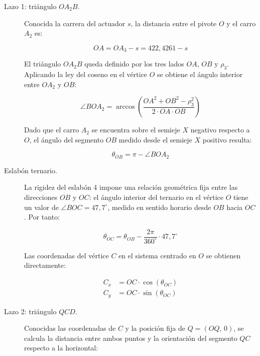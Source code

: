 \begin{description}
\item [Lazo 1: triángulo $OA_2B$.]
Conocida la carrera del actuador $s$, la distancia entre el pivote $O$ y el carro $A_2$ es:

\begin{equation}
    OA = OA_3 - s= 422,4261 - s
    \label{eq:OA_acimutal}
\end{equation}

El triángulo $OA_2B$ queda definido por los tres lados $OA$, $OB$ y $\rho_3$. Aplicando 
la ley del coseno en el vértice $O$ se obtiene el ángulo interior entre $OA_2$ y $OB$:

\begin{equation}
    \angle BOA_2 = \arccos\!\left( \frac{OA^2 + OB^2 - \rho_3^2}{2 \cdot OA \cdot OB} \right)
    \label{eq:angBOA2}
\end{equation}

Dado que el carro $A_2$ se encuentra sobre el semieje $X$ negativo respecto a $O$, el ángulo del segmento $OB$ medido desde el semieje $X$ positivo resulta:

\begin{equation}
    \theta_{OB} = \pi - \angle BOA_2
    \label{eq:thetaOB}
\end{equation}

\item[Eslabón ternario.]
La rigidez del eslabón 4 impone una relación geométrica fija entre las direcciones $OB$ y $OC$: el ángulo interior del ternario en el vértice $O$ tiene un valor de $\angle BOC = 47{,}7^{\circ}$, medido en sentido horario desde $OB$ hacia $OC$. Por tanto:

\begin{equation}
    \theta_{OC} = \theta_{OB} -\frac{2\pi}{360^{\circ}}\cdot 47{,}7^{\circ}
    \label{eq:thetaOC}
\end{equation}

Las coordenadas del vértice $C$ en el sistema centrado en $O$ se obtienen directamente:

\begin{equation}
    \begin{aligned}
        C_x &= OC \cdot \cos(\theta_{OC}) \\
        C_y &= OC \cdot \sin(\theta_{OC})
    \end{aligned}
    \label{eq:coordC}
\end{equation}

\item[Lazo 2: triángulo $QCD$.]
Conocidas las coordenadas de $C$ y la posición fija de $Q=(OQ,\,0)$, se calcula la distancia entre ambos puntos y la orientación del segmento $QC$ respecto a la horizontal:


\end{description}
